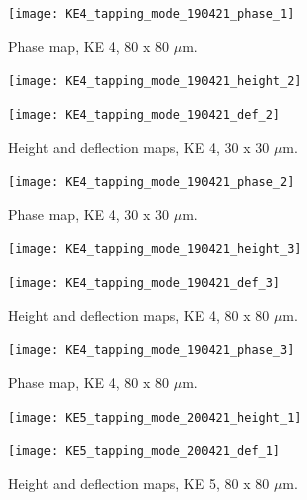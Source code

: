 \begin{figure}[H]
\centering
  \texttt{[image: KE4\_tapping\_mode\_190421\_phase\_1]}
\caption[Phase map, KE 4]{Phase map, KE 4, 80 x 80 $\mu$m.}
\label{fig:afm_ke4_phase_1}
\end{figure}


\begin{figure}[H]
\centering
\begin{minipage}{.45\textwidth}
  \centering
  \texttt{[image: KE4\_tapping\_mode\_190421\_height\_2]}
\end{minipage}
\begin{minipage}{.45\textwidth}
  \centering
  \texttt{[image: KE4\_tapping\_mode\_190421\_def\_2]}
\end{minipage}
\caption[Height and deflection maps, KE 4]{Height and deflection maps, KE 4, 30 x 30 $\mu$m.}
\label{fig:afm_ke4_height_def_2}
\end{figure}

\begin{figure}[H]
\centering
  \texttt{[image: KE4\_tapping\_mode\_190421\_phase\_2]}
\caption[Phase map, KE 4]{Phase map, KE 4, 30 x 30 $\mu$m.}
\label{fig:afm_ke4_phase_2}
\end{figure}


\begin{figure}[H]
\centering
\begin{minipage}{.45\textwidth}
  \centering
  \texttt{[image: KE4\_tapping\_mode\_190421\_height\_3]}
\end{minipage}
\begin{minipage}{.45\textwidth}
  \centering
  \texttt{[image: KE4\_tapping\_mode\_190421\_def\_3]}
\end{minipage}
\caption[Height and deflection maps, KE 4]{Height and deflection maps, KE 4, 80 x 80 $\mu$m.}
\label{fig:afm_ke4_height_def_3}
\end{figure}

\begin{figure}[H]
\centering
  \texttt{[image: KE4\_tapping\_mode\_190421\_phase\_3]}
\caption[Phase map, KE 4]{Phase map, KE 4, 80 x 80 $\mu$m.}
\label{fig:afm_ke4_phase_3}
\end{figure}




\begin{figure}[H]
\centering
\begin{minipage}{.45\textwidth}
  \centering
  \texttt{[image: KE5\_tapping\_mode\_200421\_height\_1]}
\end{minipage}
\begin{minipage}{.45\textwidth}
  \centering
  \texttt{[image: KE5\_tapping\_mode\_200421\_def\_1]}
\end{minipage}
\caption[Height and deflection maps, KE 5]{Height and deflection maps, KE 5, 80 x 80 $\mu$m.}
\label{fig:afm_ke5_height_def_1}
\end{figure}

